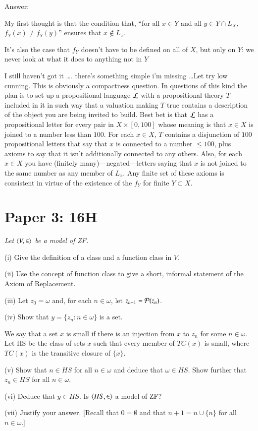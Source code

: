 \documentclass{book}
\begin{document}
Answer:

My first thought is that the condition that, ``for all $x \in Y$ and
all $y \in Y \cap L_X$, $f_Y(x) \not= f_Y(y)$'' ensures that $x \not\in L_x$.

It's also the case that $f_Y$ doesn't have to be defined on all of
$X$, but only on $Y$: we never look at what it does to anything not in $Y$

I still haven't got it \ldots.  there's something simple i'm missing
\ldots Let try low cunning.  This is obviously a compactness question.
In questions of this kind the plan is to set up a propositional
language ${\cal L}$ with a propositional theory $T$ included in it in
such way that a valuation making $T$ true contains a description of
the object you are being invited to build.  Best bet is that
${\cal L}$ has a propositional letter for every pair in
$X \times [0,100]$ whose meaning is that $x \in X$ is joined to a
number less than $100$.  For each $x \in X$, $T$ contains a disjunction
of $100$ propositional letters that say that $x$ is connected to a
number $\leq 100$, plus axioms to say that it isn't additionally
connected to any others. Also, for each $x \in X$ you have (finitely
many)---negated---letters saying that $x$ is not joined to the same
number as any member of $L_x$.  Any finite set of these axioms is
consistent in virtue of the existence of the $f_Y$ for finite
$Y \subset X$.


\section{Paper 3: 16H}

{\sl Let $\mbox{$\langle V,\in \rangle$}$ be a model of ZF.

(i)  Give the definition of a class and  a function class in $V$.

(ii)   Use the concept of function class to give a short,
  informal statement of the Axiom of Replacement.

(iii)   Let $z_0=\omega$ and, for
  each $n\in\omega$, let $z_{n+1}={\cal P}(z_n)$.

(iv)  Show that $y=\{z_n:n\in\omega\}$ is a set.

We say that a set $x$ is small if there is an injection from $x$ to $z_n$
for some $n\in\omega$.  Let HS be the class of sets $x$ such that every
member of $TC({x})$ is small, where $TC({x})$ is the transitive closure
of $\{x\}$.

(v) Show that $n\in HS$ for all $n\in\omega$ and deduce that
$\omega\in HS$. Show further that $z_n\in HS$ for all $n\in\omega$.

(vi) Deduce that $y\in HS$. Is $\mbox{$\langle HS,\in \rangle$}$ a model of ZF?

(vii) Justify your answer. [Recall that $0 =\emptyset$ and that
  $n+1=n\cup\{n\}$ for all $n\in\omega$.]}
\end{document}
